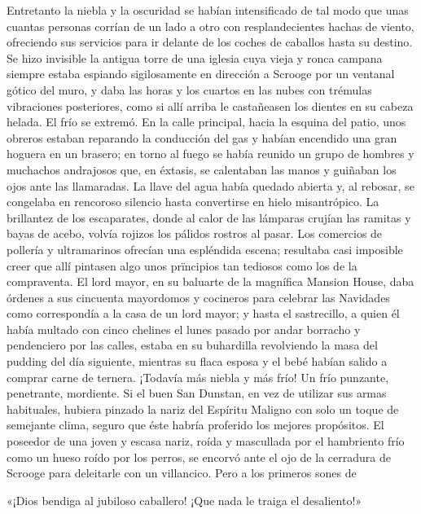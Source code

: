 \documentclass{novela}
\begin{document}
 Entretanto la niebla y la oscuridad se habían intensificado de tal modo que unas cuantas personas corrían de un lado a otro con resplandecientes hachas de viento, ofreciendo sus servicios para ir delante de los coches de caballos hasta su destino. Se hizo invisible la antigua torre de una iglesia cuya vieja y ronca campana siempre estaba espiando sigilosamente en dirección a Scrooge por un ventanal gótico del muro, y daba las horas y los cuartos en las nubes con trémulas vibraciones posteriores, como si allí arriba le castañeasen los dientes en su cabeza helada. El frío se extremó. En la calle principal, hacia la esquina del patio, unos obreros estaban reparando la conducción del gas y habían encendido una gran hoguera en un brasero; en torno al fuego se había reunido un grupo de hombres y muchachos andrajosos que, en éxtasis, se calentaban las manos y guiñaban los ojos ante las llamaradas. La llave del agua había quedado abierta y, al rebosar, se congelaba en rencoroso silencio hasta convertirse en hielo misantrópico. La brillantez de los escaparates, donde al calor de las lámparas crujían las ramitas y bayas de acebo, volvía rojizos los pálidos rostros al pasar. Los comercios de pollería y ultramarinos ofrecían una espléndida escena; resultaba casi imposible creer que allí pintasen algo unos prïncipios tan tediosos como los de la compraventa. El lord mayor, en su baluarte de la magnífica Mansion House, daba órdenes a sus cincuenta mayordomos y cocineros para celebrar las Navidades como correspondía a la casa de un lord mayor; y hasta el sastrecillo, a quien él había multado con cinco chelines el lunes pasado por andar borracho y pendenciero por las calles, estaba en su buhardilla revolviendo la masa del pudding del día siguiente, mientras su flaca esposa y el bebé habían salido a comprar carne de ternera.
 ¡Todavía más niebla y más frío! Un frío punzante, penetrante, mordiente. Si el buen San Dunstan, en vez de utilizar sus armas habituales, hubiera pinzado la nariz del Espíritu Maligno con solo un toque de semejante clima, seguro que éste habría proferido los mejores propósitos. El poseedor de una joven y escasa nariz, roída  y mascullada por el hambriento frío como un hueso roído por los perros, se encorvó ante el ojo de la cerradura de Scrooge para deleitarle con un villancico. Pero a los primeros sones de


           «¡Dios bendiga al jubiloso caballero!
           ¡Que nada le traiga el desaliento!»
\end{document}
